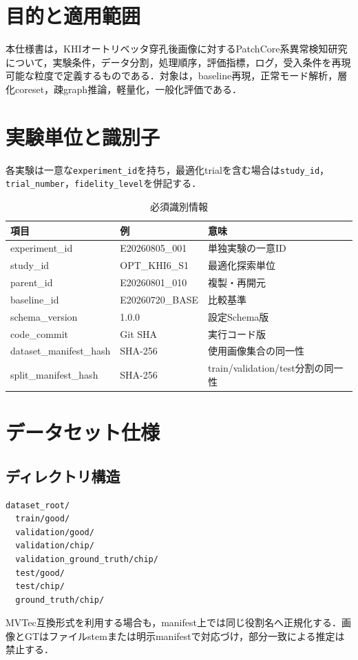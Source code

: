 \documentclass[a4paper,11pt]{ltjsarticle}
\begin{document}

\section{目的と適用範囲}
本仕様書は，KHIオートリベッタ穿孔後画像に対するPatchCore系異常検知研究について，実験条件，データ分割，処理順序，評価指標，ログ，受入条件を再現可能な粒度で定義するものである．対象は，baseline再現，正常モード解析，層化coreset，疎graph推論，軽量化，一般化評価である．


\section{実験単位と識別子}
各実験は一意な\texttt{experiment\_id}を持ち，最適化trialを含む場合は\texttt{study\_id}，\texttt{trial\_number}，\texttt{fidelity\_level}を併記する．

\begin{table}[H]
\centering
\caption{必須識別情報}
\begin{tabularx}{\linewidth}{L{42mm}L{35mm}Y}
\toprule
項目 & 例 & 意味 \\
\midrule
experiment\_id & E20260805\_001 & 単独実験の一意ID \\
study\_id & OPT\_KHI6\_S1 & 最適化探索単位 \\
parent\_id & E20260801\_010 & 複製・再開元 \\
baseline\_id & E20260720\_BASE & 比較基準 \\
schema\_version & 1.0.0 & 設定Schema版 \\
code\_commit & Git SHA & 実行コード版 \\
dataset\_manifest\_hash & SHA-256 & 使用画像集合の同一性 \\
split\_manifest\_hash & SHA-256 & train/validation/test分割の同一性 \\
\bottomrule
\end{tabularx}
\end{table}

\section{データセット仕様}
\subsection{ディレクトリ構造}
\begin{lstlisting}
dataset_root/
  train/good/
  validation/good/
  validation/chip/
  validation_ground_truth/chip/
  test/good/
  test/chip/
  ground_truth/chip/
\end{lstlisting}
MVTec互換形式を利用する場合も，manifest上では同じ役割名へ正規化する．画像とGTはファイルstemまたは明示manifestで対応づけ，部分一致による推定は禁止する．
\end{document}
